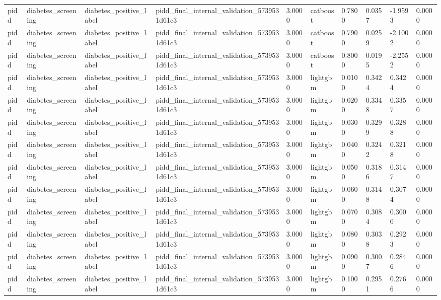 \begin{tabular}{llllllllll}
pidd & diabetes\_screening & diabetes\_positive\_label & pidd\_final\_internal\_validation\_5739531d61c3 & 3.0000 & catboost & 0.7800 & 0.0357 & -1.9593 & 0.0000 \\
pidd & diabetes\_screening & diabetes\_positive\_label & pidd\_final\_internal\_validation\_5739531d61c3 & 3.0000 & catboost & 0.7900 & 0.0259 & -2.1002 & 0.0000 \\
pidd & diabetes\_screening & diabetes\_positive\_label & pidd\_final\_internal\_validation\_5739531d61c3 & 3.0000 & catboost & 0.8000 & 0.0195 & -2.2552 & 0.0000 \\
pidd & diabetes\_screening & diabetes\_positive\_label & pidd\_final\_internal\_validation\_5739531d61c3 & 3.0000 & lightgbm & 0.0100 & 0.3424 & 0.3424 & 0.0000 \\
pidd & diabetes\_screening & diabetes\_positive\_label & pidd\_final\_internal\_validation\_5739531d61c3 & 3.0000 & lightgbm & 0.0200 & 0.3348 & 0.3357 & 0.0000 \\
pidd & diabetes\_screening & diabetes\_positive\_label & pidd\_final\_internal\_validation\_5739531d61c3 & 3.0000 & lightgbm & 0.0300 & 0.3299 & 0.3288 & 0.0000 \\
pidd & diabetes\_screening & diabetes\_positive\_label & pidd\_final\_internal\_validation\_5739531d61c3 & 3.0000 & lightgbm & 0.0400 & 0.3242 & 0.3218 & 0.0000 \\
pidd & diabetes\_screening & diabetes\_positive\_label & pidd\_final\_internal\_validation\_5739531d61c3 & 3.0000 & lightgbm & 0.0500 & 0.3186 & 0.3147 & 0.0000 \\
pidd & diabetes\_screening & diabetes\_positive\_label & pidd\_final\_internal\_validation\_5739531d61c3 & 3.0000 & lightgbm & 0.0600 & 0.3148 & 0.3074 & 0.0000 \\
pidd & diabetes\_screening & diabetes\_positive\_label & pidd\_final\_internal\_validation\_5739531d61c3 & 3.0000 & lightgbm & 0.0700 & 0.3084 & 0.3000 & 0.0000 \\
pidd & diabetes\_screening & diabetes\_positive\_label & pidd\_final\_internal\_validation\_5739531d61c3 & 3.0000 & lightgbm & 0.0800 & 0.3038 & 0.2923 & 0.0000 \\
pidd & diabetes\_screening & diabetes\_positive\_label & pidd\_final\_internal\_validation\_5739531d61c3 & 3.0000 & lightgbm & 0.0900 & 0.3007 & 0.2846 & 0.0000 \\
pidd & diabetes\_screening & diabetes\_positive\_label & pidd\_final\_internal\_validation\_5739531d61c3 & 3.0000 & lightgbm & 0.1000 & 0.2951 & 0.2766 & 0.0000 \\

\end{tabular}
